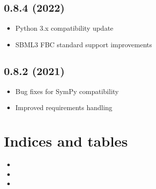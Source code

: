 \documentclass[letterpaper,12pt,english]{sphinxmanual}
\begin{document}
\section{0.8.4 (2022)}
\label{\detokenize{release-notes:id2}}\begin{itemize}
\item {} 
\sphinxAtStartPar
Python 3.x compatibility update

\item {} 
\sphinxAtStartPar
SBML3 FBC standard support improvements

\end{itemize}


\section{0.8.2 (2021)}
\label{\detokenize{release-notes:id3}}\begin{itemize}
\item {} 
\sphinxAtStartPar
Bug fixes for SymPy compatibility

\item {} 
\sphinxAtStartPar
Improved requirements handling

\end{itemize}


\chapter{Indices and tables}
\label{\detokenize{index:indices-and-tables}}\begin{itemize}
\item {} 
\sphinxAtStartPar
{}

\item {} 
\sphinxAtStartPar
{}

\item {} 
\sphinxAtStartPar
{}

\end{itemize}
\end{document}

